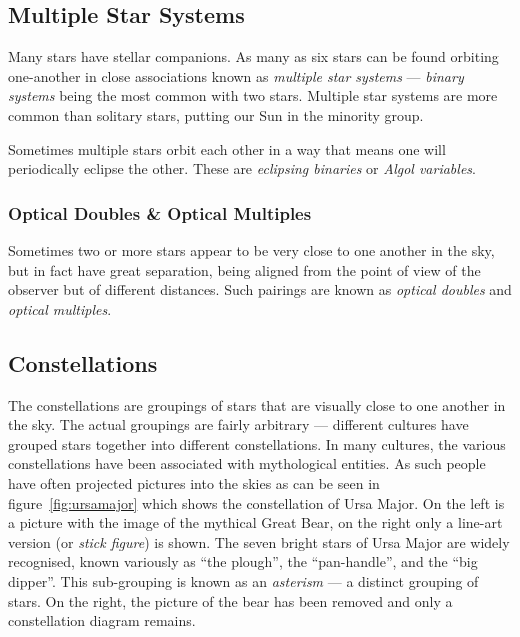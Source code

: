 \subsection{Multiple Star Systems}
\label{sec:Phenomena:multipleStars}

Many stars have stellar companions. As many as six stars can be found
orbiting one-another in close associations known as
\emph{multiple star systems} --- \emph{binary systems} being the most
common with two stars. Multiple star systems are more common than
solitary stars, putting our Sun in the minority group.

Sometimes multiple stars orbit each other in a way that means one will
periodically eclipse the other. These are \emph{eclipsing binaries} or
\emph{Algol variables}.

\subsubsection{Optical Doubles \& Optical Multiples}
\label{sec:Phenomena:multipleStars:optical}

Sometimes two or more stars appear to be very close to one another in
the sky, but in fact have great separation, being aligned from the point
of view of the observer but of different distances. Such pairings are
known as \emph{optical doubles} and \emph{optical multiples}.

\subsection{Constellations}
\label{sec:Phenomena:Constellations}

The constellations are groupings of stars that are visually close to one
another in the sky. The actual groupings are fairly arbitrary ---
different cultures have grouped stars together into different
constellations. In many cultures, the various constellations have been
associated with mythological entities. As such people have often
projected pictures into the skies as can be seen in figure~\ref{fig:ursamajor} which shows the constellation of Ursa Major. On the
left is a picture with the image of the mythical Great Bear, on the
right only a line-art version (or \emph{stick figure}) is shown. The seven bright stars of Ursa
Major are widely recognised, known variously as ``the plough'', the
``pan-handle'', and the ``big dipper''. This sub-grouping is known as an
\emph{asterism} --- a distinct grouping of stars. On the right, the
picture of the bear has been removed and only a constellation diagram
remains.

